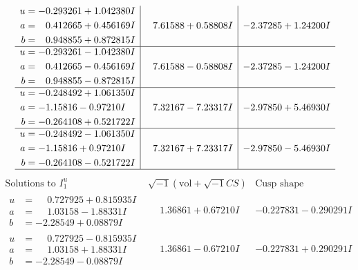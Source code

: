 \documentclass[1p]{elsarticle_modified}
\theoremstyle{definition}
\newcommand{\I}{\sqrt{-1}}
\begin{document}
$$\begin{array}{c|c|c}
\begin{aligned}
u &= -0.293261 + 1.042380 I \\
a &= \phantom{-}0.412665 + 0.456169 I \\
b &= \phantom{-}0.948855 + 0.872815 I\end{aligned}
 & \phantom{-}7.61588 + 0.58808 I & -2.37285 + 1.24200 I \\ \hline\begin{aligned}
u &= -0.293261 - 1.042380 I \\
a &= \phantom{-}0.412665 - 0.456169 I \\
b &= \phantom{-}0.948855 - 0.872815 I\end{aligned}
 & \phantom{-}7.61588 - 0.58808 I & -2.37285 - 1.24200 I \\ \hline\begin{aligned}
u &= -0.248492 + 1.061350 I \\
a &= -1.15816 - 0.97210 I \\
b &= -0.264108 + 0.521722 I\end{aligned}
 & \phantom{-}7.32167 - 7.23317 I & -2.97850 + 5.46930 I \\ \hline\begin{aligned}
u &= -0.248492 - 1.061350 I \\
a &= -1.15816 + 0.97210 I \\
b &= -0.264108 - 0.521722 I\end{aligned}
 & \phantom{-}7.32167 + 7.23317 I & -2.97850 - 5.46930 I\\
 \hline 
 \end{array}$$\newpage$$\begin{array}{c|c|c}  
\text{Solutions to }I^u_{1}& \I (\text{vol} + \sqrt{-1}CS) & \text{Cusp shape}\\
 \hline 
\begin{aligned}
u &= \phantom{-}0.727925 + 0.815935 I \\
a &= \phantom{-}1.03158 - 1.88331 I \\
b &= -2.28549 + 0.08879 I\end{aligned}
 & \phantom{-}1.36861 + 0.67210 I & -0.227831 - 0.290291 I \\ \hline\begin{aligned}
u &= \phantom{-}0.727925 - 0.815935 I \\
a &= \phantom{-}1.03158 + 1.88331 I \\
b &= -2.28549 - 0.08879 I\end{aligned}
 & \phantom{-}1.36861 - 0.67210 I & -0.227831 + 0.290291 I \\ \hline\begin{aligned}

\end{aligned}
\end{array}$$
\end{document}
